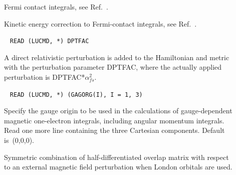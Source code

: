 \begin{description}
\item[] Fermi contact integrals,
see Ref.~\cite{ovhapjhjajsbpthjcp96}.


\item[] Kinetic energy correction to Fermi-contact integrals,
see Ref.~\cite{pmpljvkrjcp119}.


\item[]\verb| |\newline
\verb|READ (LUCMD, *) DPTFAC|

A direct relativistic perturbation is added to the
  Hamiltonian and metric with the perturbation parameter DPTFAC, where
  the actually applied perturbation is DPTFAC*$\alpha_{fs}^2$.

\item[]\verb| |\newline
\verb|READ (LUCMD, *) (GAGORG(I), I = 1, 3)|

Specify the gauge origin to be used in the
calculations of gauge-dependent magnetic one-electron integrals,
including angular momentum integrals.
Read one more line containing the three Cartesian components. Default is~(0,0,0).

\item[] Symmetric combination of half-differentiated
  overlap matrix with respect to an external magnetic field
  perturbation when London orbitals are used.


\end{description}
